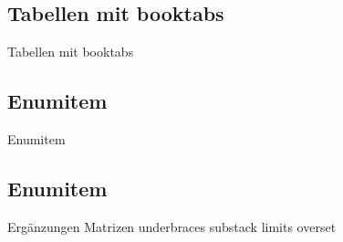 \subsection{Tabellen mit booktabs}
\begin{frame}[c]
	\begin{center}
		\large Tabellen mit booktabs
	\end{center}
\end{frame}
\subsection{Enumitem}
\begin{frame}[c]
	\begin{center}
		\large Enumitem
	\end{center}
\end{frame}
\subsection{Enumitem}
\begin{frame}[c]
	\begin{center}
		\large Ergänzungen Matrizen  underbraces substack limits overset 
	\end{center}
\end{frame}

